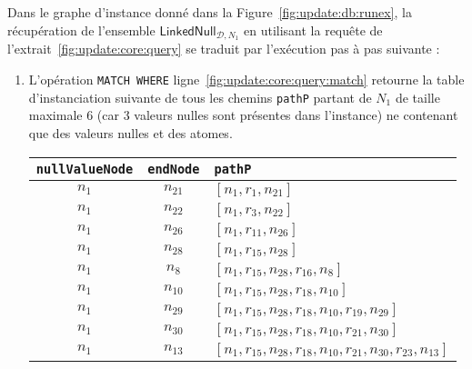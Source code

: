 \begin{example}
	Dans le graphe d'instance donné dans la Figure~\ref{fig:update:db:runex}, la récupération de l'ensemble $\textsf{LinkedNull}_{\mathcal{D}, N_1}$ en utilisant la requête de l'extrait~\ref{fig:update:core:query} se traduit par l'exécution pas à pas suivante :
	\begin{enumerate}[label=\emph{Etape~\arabic*},leftmargin=*]
		\item L'opération \verb|MATCH WHERE| ligne~\ref{fig:update:core:query:match} retourne la table d'instanciation suivante de tous les chemins \verb|pathP| partant de $N_1$ de taille maximale 6 (car 3 valeurs nulles sont présentes dans l'instance) ne contenant que des valeurs nulles et des atomes.
		      \begin{center}
			      \begin{tabular}{ccl}
				      \hline
				      \verb|nullValueNode| & \verb|endNode| & \verb|pathP|                                                              \\
				      \hline
				      $n_{1}$              & $n_{21}$       & $[n_{1}, r_{1}, n_{21}]$                                                  \\
				      $n_{1}$              & $n_{22}$       & $[n_{1}, r_{3}, n_{22}]$                                                  \\
				      $n_{1}$              & $n_{26}$       & $[n_{1}, r_{11}, n_{26}]$                                                 \\
				      $n_{1}$              & $n_{28}$       & $[n_{1}, r_{15}, n_{28}]$                                                 \\
				      $n_{1}$              & $n_{8}$        & $[n_{1}, r_{15}, n_{28}, r_{16}, n_{8}]$                                  \\
				      $n_{1}$              & $n_{10}$       & $[n_{1}, r_{15}, n_{28}, r_{18}, n_{10}]$                                 \\
				      $n_{1}$              & $n_{29}$       & $[n_{1}, r_{15}, n_{28}, r_{18}, n_{10}, r_{19}, n_{29}]$                                 \\
				      $n_{1}$              & $n_{30}$       & $[n_{1}, r_{15}, n_{28}, r_{18}, n_{10}, r_{21}, n_{30}]$                 \\
				      $n_{1}$              & $n_{13}$       & $[n_{1}, r_{15}, n_{28}, r_{18}, n_{10}, r_{21}, n_{30}, r_{23}, n_{13}]$ \\
				      \hline
			      \end{tabular}
		      \end{center}


\end{enumerate}
\end{example}
